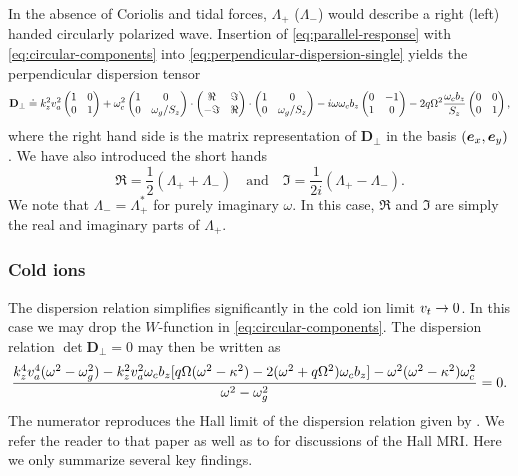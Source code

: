 \documentclass[aps,pre,notitlepage,amsmath,amssymb,amsfonts,nobibnotes,nofootinbib,superscriptaddress]{revtex4-1}
\begin{document}
In the absence of Coriolis and tidal forces, $\Lambda_{+}$ ($\Lambda_{-}$)
would describe a right (left) handed circularly polarized wave. Insertion of
\cref{eq:parallel-response} with \cref{eq:circular-components} into
\cref{eq:perpendicular-dispersion-single} yields the perpendicular dispersion
tensor
\begin{equation}
  \label{eq:D-perp}
  \mathbf{D}_\perp \doteq
  k_z^2\va^2\begin{pmatrix} 1 & 0 \\ 0 & 1\end{pmatrix}
  + \omc^2\begin{pmatrix}
    1 & 0 \\ 0 & \omg/S_z
  \end{pmatrix}
  \cdot\begin{pmatrix}
    \Re & \Im \\ -\Im & \Re
  \end{pmatrix}
  \cdot\begin{pmatrix}
    1 & 0 \\ 0 & \omg/S_z
  \end{pmatrix}
  - i\omega\omc b_z\begin{pmatrix} 0 & -1 \\ 1 & 0\end{pmatrix}
  -2q\Omega^2\frac{\omc b_z}{S_z}\begin{pmatrix} 0 & 0 \\ 0 & 1\end{pmatrix},
\end{equation}
where the right hand side is the matrix representation of $\mathbf{D}_\perp$
in the basis $(\bm{e}_x,\bm{e}_y)$. We have also introduced the short hands
\begin{equation}
  \Re = \frac{1}{2}(\Lambda_{+} + \Lambda_{-})
  \quad\textrm{and}\quad
  \Im = \frac{1}{2i}(\Lambda_{+} - \Lambda_{-}).
\end{equation}
We note that $\Lambda_{-}=\Lambda_{+}^\ast$ for purely imaginary $\omega$. In
this case, $\Re$ and $\Im$ are simply the real and imaginary parts of
$\Lambda_{+}$.

\subsubsection{Cold ions}
\label{sec:cold-ions}

The dispersion relation simplifies significantly in the cold ion limit
$v_t\to0$. In this case we may drop the $W$-function in
\cref{eq:circular-components}. The dispersion relation
$\det\mathbf{D}_\perp=0$ may then be written as
\begin{equation}
  \label{eq:cold-mri-dispersion}
  \frac{k_z^4\va^4(\omega^2 - \omg^2)
  - k_z^2\va^2\omc b_z[q\Omega(\omega^2 - \kappa^2)
  - 2(\omega^2 + q\Omega^2)\omc b_z]
  - \omega^2(\omega^2 - \kappa^2)\omc^2}{\omega^2 - \omg^2} = 0.
\end{equation}
The numerator reproduces the Hall limit of the dispersion relation given by
\citet{Wardle1999}. We refer the reader to that paper as well as to
\citet{Balbus2001} for discussions of the Hall MRI\@. Here we only summarize
several key findings.
\end{document}
